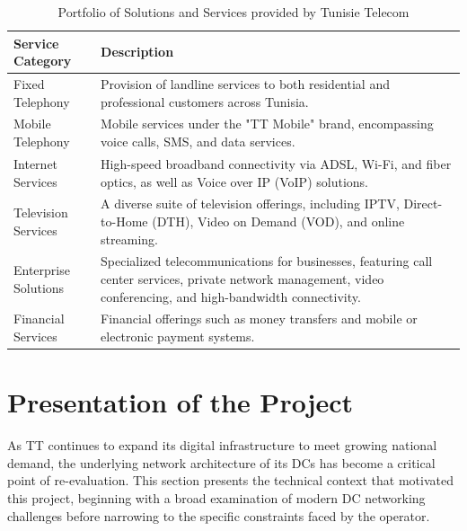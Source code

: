 \begin{table}[!htbp]
    \centering
    \small 
    \renewcommand{\arraystretch}{1.3}
    \begin{tabularx}{\textwidth}{|p{3.5cm}|X|}
        \hline
        \textbf{Service Category} & \textbf{Description} \\ \hline
        Fixed Telephony & Provision of landline services to both residential and professional customers across Tunisia. \\ \hline
        Mobile Telephony & Mobile services under the "TT Mobile" brand, encompassing voice calls, SMS, and data services. \\ \hline
        Internet Services & High-speed broadband connectivity via ADSL, Wi-Fi, and fiber optics, as well as Voice over IP (VoIP) solutions. \\ \hline
        Television Services & A diverse suite of television offerings, including IPTV, Direct-to-Home (DTH), Video on Demand (VOD), and online streaming. \\ \hline
        Enterprise Solutions & Specialized telecommunications for businesses, featuring call center services, private network management, video conferencing, and high-bandwidth connectivity. \\ \hline
        Financial Services & Financial offerings such as money transfers and mobile or electronic payment systems. \\ \hline
    \end{tabularx}
    \caption{Portfolio of Solutions and Services provided by Tunisie Telecom}
    \label{tab:tt_services}
\end{table}

\section{Presentation of the Project}
As TT continues to expand its digital infrastructure to meet growing national demand, the underlying network architecture of its DCs has become a critical point of re-evaluation. This section presents the technical context that motivated this project, beginning with a broad examination of modern DC networking challenges before narrowing to the specific constraints faced by the operator.

